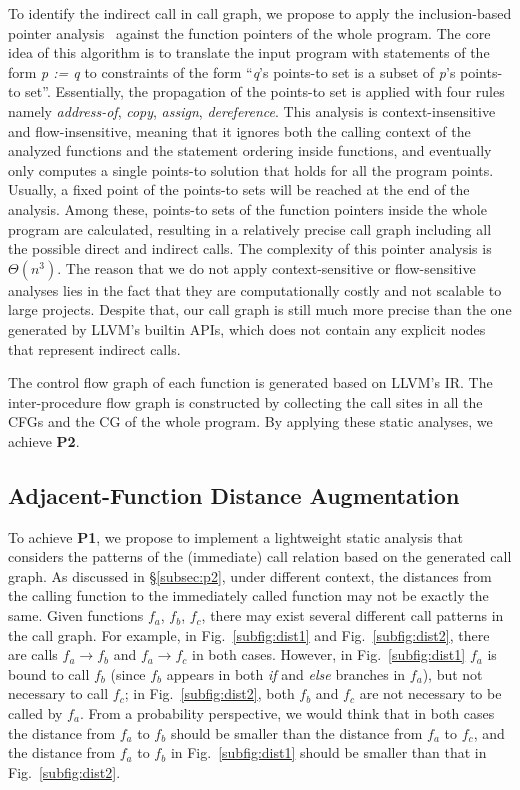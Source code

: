 To identify the indirect call in call graph, we propose to apply the inclusion-based pointer analysis~\cite{Andersen94programanalysis} against the function pointers of the whole program. The core idea of this algorithm is to translate the input program with statements of the form \emph{p := q} to constraints of the form ``\emph{q}'s points-to set is a subset of \emph{p}'s points-to set''. 
Essentially, the propagation of the points-to set is applied with four rules namely \emph{address-of}, \emph{copy}, \emph{assign}, \emph{dereference}. This analysis is context-insensitive and flow-insensitive, meaning that it ignores both the calling context of the analyzed functions and the statement ordering inside functions, and eventually only computes a single points-to solution that holds for all the program points. Usually, a fixed point of the points-to sets will be reached at the end of the analysis. Among these, points-to sets of the function pointers inside the whole program are calculated, resulting in a relatively precise call graph including all the possible direct and indirect calls. The complexity of this pointer analysis is $\Theta(n^3)$.
The reason that we do not apply context-sensitive or flow-sensitive analyses lies in the fact that they are computationally costly and not scalable to large projects. Despite that, our call graph is still much more precise than the one generated by LLVM's builtin APIs, which does not contain any explicit nodes that represent indirect calls. 

The control flow graph of each function is generated based on LLVM's IR. The inter-procedure flow graph is constructed by collecting the call sites in all the CFGs and the CG of the whole program.  By applying these static analyses, we achieve \textbf{P2}.




\subsection{Adjacent-Function Distance Augmentation} \label{subsec:functionDist}
To achieve \textbf{P1}, we propose to implement a lightweight static analysis that considers the patterns of the (immediate) call relation based on the generated call graph.
As discussed in \S\ref{subsec:p2}, under different context, the distances from the calling function to the immediately called function may not be exactly the same. 
Given functions $f_a$, $f_b$, $f_c$, there may exist several different call patterns in the call graph. 
For example, in Fig.~\ref{subfig:dist1} and Fig.~\ref{subfig:dist2}, there are calls $f_a\rightarrow f_b$  and  $f_a\rightarrow f_c$ in both cases. 
However, in Fig.~\ref{subfig:dist1}  $f_a$ is bound to call $f_b$ (since $f_b$ appears in both \emph{if} and \emph{else} branches in $f_a$), but not necessary to call $f_c$; in Fig.~\ref{subfig:dist2}, both $f_b$ and $f_c$ are not necessary to be called by $f_a$.
From a probability perspective, we would think that in both cases the distance from $f_a$ to $f_b$ should be smaller than the distance from $f_a$ to $f_c$, and the distance from $f_a$ to $f_b$ in Fig.~\ref{subfig:dist1} should be smaller than that in  Fig.~\ref{subfig:dist2}. 


